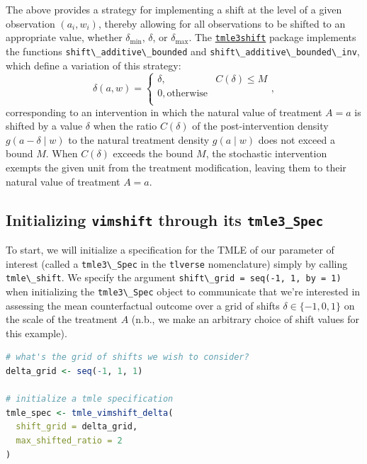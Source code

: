 \documentclass[
  12pt, krantz2,
]{krantz}
\newcommand{\passthrough}[1]{#1}
\theoremstyle{definition}
\theoremstyle{definition}
\theoremstyle{definition}
\newcommand{\1}{\mathbbm{1}}
\begin{document}
The above provides a strategy for implementing a shift at the level of a given
observation \((a_i, w_i)\), thereby allowing for all observations to be shifted to
an appropriate value, whether \(\delta_{\text{min}}\), \(\delta\), or
\(\delta_{\text{max}}\). The \href{https://github.com/tlverse/tmle3shift}{\passthrough{\lstinline!tmle3shift!}}
package implements the functions \passthrough{\lstinline!shift\_additive\_bounded!} and
\passthrough{\lstinline!shift\_additive\_bounded\_inv!}, which define a variation of this strategy:
\begin{equation}
  \delta(a, w) =
    \begin{cases}
      \delta, & C(\delta) \leq M \\
      0, \text{otherwise} \\
    \end{cases},
  \label{eq:shift-bounded-simple}
\end{equation}
corresponding to an intervention in which the natural value of treatment \(A = a\)
is shifted by a value \(\delta\) when the ratio \(C(\delta)\) of the
post-intervention density \(g(a - \delta \mid w)\) to the natural treatment
density \(g(a \mid w)\) does not exceed a bound \(M\). When \(C(\delta)\) exceeds the
bound \(M\), the stochastic intervention exempts the given unit from the treatment
modification, leaving them to their natural value of treatment \(A = a\).

\hypertarget{initializing-vimshift-through-its-tmle3_spec}{%
\subsection{\texorpdfstring{Initializing \texttt{vimshift} through its \texttt{tmle3\_Spec}}{Initializing vimshift through its tmle3\_Spec}}\label{initializing-vimshift-through-its-tmle3_spec}}

To start, we will initialize a specification for the TMLE of our parameter of
interest (called a \passthrough{\lstinline!tmle3\_Spec!} in the \passthrough{\lstinline!tlverse!} nomenclature) simply by calling
\passthrough{\lstinline!tmle\_shift!}. We specify the argument \passthrough{\lstinline!shift\_grid = seq(-1, 1, by = 1)!}
when initializing the \passthrough{\lstinline!tmle3\_Spec!} object to communicate that we're interested
in assessing the mean counterfactual outcome over a grid of shifts \(\delta \in \{-1, 0, 1\}\) on the scale of the treatment \(A\) (n.b., we make an arbitrary
choice of shift values for this example).

\begin{lstlisting}[language=R]
# what's the grid of shifts we wish to consider?
delta_grid <- seq(-1, 1, 1)

# initialize a tmle specification
tmle_spec <- tmle_vimshift_delta(
  shift_grid = delta_grid,
  max_shifted_ratio = 2
)
\end{lstlisting}
\end{document}
